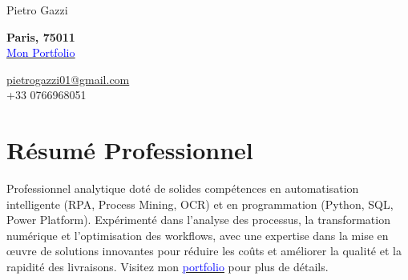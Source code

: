 \documentclass[letterpaper,10.5pt]{article}
\begin{document}

\begin{center}
    {\LARGE Pietro Gazzi}\\
        \begin{multicols}{2}
        \begin{flushleft}
            \textbf{Paris, 75011}\\
            \href{https://pietrowei.github.io/Portfolio}{\underline{\textcolor{blue}{Mon Portfolio}}}
        \end{flushleft}
        \begin{flushright}
            \href{mailto:pietrogazzi01@gmail.com}{pietrogazzi01@gmail.com}\\
            +33 0766968051
        \end{flushright}
    \end{multicols}
\end{center}

\section*{Résumé Professionnel}
Professionnel analytique doté de solides compétences en automatisation intelligente (RPA, Process Mining, OCR) et en programmation (Python, SQL, Power Platform). Expérimenté dans l'analyse des processus, la transformation numérique et l'optimisation des workflows, avec une expertise dans la mise en œuvre de solutions innovantes pour réduire les coûts et améliorer la qualité et la rapidité des livraisons. Visitez mon \href{https://pietrowei.github.io/Portfolio}{\underline{\textcolor{blue}{portfolio}}} pour plus de détails.

\end{document}
